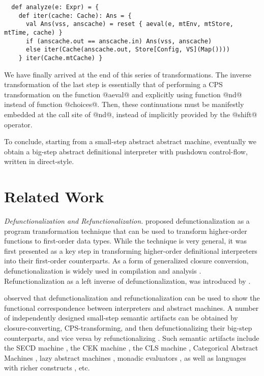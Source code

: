 \documentclass[acmsmall, screen]{acmart}\settopmatter{}
\begin{document}
\begin{lstlisting}
  def analyze(e: Expr) = {
    def iter(cache: Cache): Ans = {
      val Ans(vss, anscache) = reset { aeval(e, mtEnv, mtStore, mtTime, cache) }
      if (anscache.out == anscache.in) Ans(vss, anscache)
      else iter(Cache(anscache.out, Store[Config, VS](Map())))
    } iter(Cache.mtCache) }
\end{lstlisting}

We have finally arrived at the end of this series of transformations.
The inverse transformation of the last step is essentially that of performing a CPS transformation on the function @aeval@ and
explicitly using function @nd@ instead of function @choices@. Then, these continuations must be
manifestly embedded at the call site of @nd@, instead of implicitly provided by the @shift@ operator.

To conclude, starting from a small-step abstract abstract machine, eventually we obtain a
big-step abstract definitional interpreter with pushdown control-flow, written in direct-style.


\section{Related Work}\label{sec:related}

\textit{Defunctionalization and Refunctionalization.}
\citet{Reynolds:72} proposed defunctionalization as a program transformation
technique that can be used to transform higher-order functions to first-order data types.
While the technique is very general, it was first presented as a key step in
transforming higher-order definitional interpreters into their first-order
counterparts.
As a form of generalized closure conversion,
defunctionalization is widely used in compilation and analysis \cite{pottier2006polymorphic,
Eisenberg:2014:PFT:2633357.2633361, fourtounis2014modular, 10.1007/3-540-46425-5_4, consel1993tour}.
Refunctionalization as a
left inverse of defunctionalization, was introduced
by \citet{Danvy:2006:RW:2171265.2171268,DANVY2009534}.

 observed that defunctionalization and refunctionalization
can be used to show the functional correspondence between interpreters and abstract machines. A number of independently designed small-step semantic artifacts can
be obtained by closure-converting, CPS-transforming, and then defunctionalizing their big-step counterparts,
and vice versa by refunctionalizing \cite{DANVY2009534}.
Such semantic artifacts include the SECD machine \cite{10.1007/11431664_4, Ager:2003:FCE:888251.888254, DanvySECDJ},
the CEK machine \cite{Ager:2003:FCE:888251.888254}, the CLS machine  \cite{Ager:2003:FCE:888251.888254},
Categorical Abstract Machines \cite{Ager:2003:FCE:888251.888254}, lazy abstract machines \cite{AGER2004223},
monadic evaluators \cite{ager2005functional}, as well as languages with richer constructs
\cite{Danvy:2008:DIP:1411204.1411206, danvy2009towards, biernacka2009towards}, etc.
\end{document}
